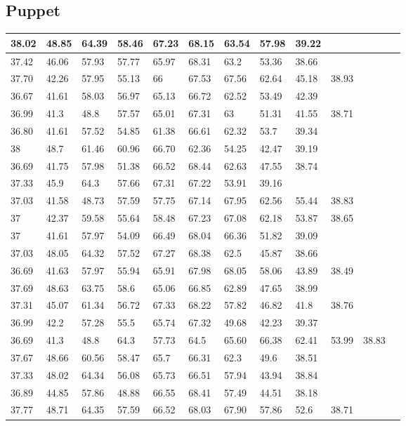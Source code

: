 \subsection{Puppet}
\label{dataset:deploytijden:puppet}
\begin{longtable}{ | l | l | l | l | l | l | l | l | l | l | l | l }
\hline
	38.02 & 48.85 & 64.39 & 58.46 & 67.23 & 68.15 & 63.54 & 57.98 & 39.22  & &  \\ \hline
	37.42 & 46.06 & 57.93 & 57.77 & 65.97 & 68.31 & 63.2 & 53.36 & 38.66 && \\ \hline
	37.70 & 42.26 & 57.95 & 55.13 & 66 & 67.53 & 67.56 & 62.64 & 45.18 & 38.93  & \\ \hline
	36.67 & 41.61 & 58.03 & 56.97 & 65.13 & 66.72 & 62.52 & 53.49 & 42.39 && \\ \hline
	36.99 & 41.3 & 48.8 & 57.57 & 65.01 & 67.31 & 63 & 51.31 & 41.55 & 38.71 & \\ \hline
	36.80 & 41.61 & 57.52 & 54.85 & 61.38 & 66.61 & 62.32 & 53.7 & 39.34 && \\ \hline
	38 & 48.7 & 61.46 & 60.96 & 66.70 & 62.36 & 54.25 & 42.47 & 39.19 && \\ \hline
	36.69 & 41.75 & 57.98 & 51.38 & 66.52 & 68.44 & 62.63 & 47.55 & 38.74 && \\ \hline
	37.33 & 45.9 & 64.3 & 57.66 & 67.31 & 67.22 & 53.91 & 39.16 &  && \\ \hline
	37.03 & 41.58 & 48.73 & 57.59 & 57.75 & 67.14 & 67.95 & 62.56 & 55.44 & 38.83 &    \\ \hline
	37 & 42.37 & 59.58 & 55.64 & 58.48 & 67.23 & 67.08 & 62.18 & 53.87 & 38.65 & \\ \hline
	37 & 41.61 & 57.97 & 54.09 & 66.49 & 68.04 & 66.36 & 51.82 & 39.09  & &\\ \hline
	37.03 & 48.05 & 64.32 & 57.52 & 67.27 & 68.38 & 62.5 & 45.87 & 38.66  & & \\ \hline
	36.69 & 41.63 & 57.97 & 55.94 & 65.91 & 67.98 & 68.05 & 58.06 & 43.89 & 38.49  & \\ \hline
	37.69 & 48.63 & 63.75 & 58.6 & 65.06 & 66.85 & 62.89 & 47.65 & 38.99&&    \\ \hline
	37.31 & 45.07 & 61.34 & 56.72 & 67.33 & 68.22 & 57.82 & 46.82 & 41.8 & 38.76  &  \\ \hline
	36.99 & 42.2 & 57.28 & 55.5 & 65.74 & 67.32 & 49.68 & 42.23 & 39.37   &&\\ \hline
	36.69 & 41.3 & 48.8 & 64.3 & 57.73 & 64.5 & 65.60 & 66.38 & 62.41 & 53.99 & 38.83  \\ \hline
	37.67 & 48.66 & 60.56 & 58.47 & 65.7 & 66.31 & 62.3 & 49.6 & 38.51&&  \\ \hline
	37.33 & 48.02 & 64.34 & 56.08 & 65.73 & 66.51 & 57.94 & 43.94 & 38.84 &&   \\ \hline
	36.89 & 44.85 & 57.86 & 48.88 & 66.55 & 68.41 & 57.49 & 44.51 & 38.18  && \\ \hline
	37.77 & 48.71 & 64.35 & 57.59 & 66.52 & 68.03 & 67.90 & 57.86 & 52.6 & 38.71 &  \\ \hline	
\end{longtable}

